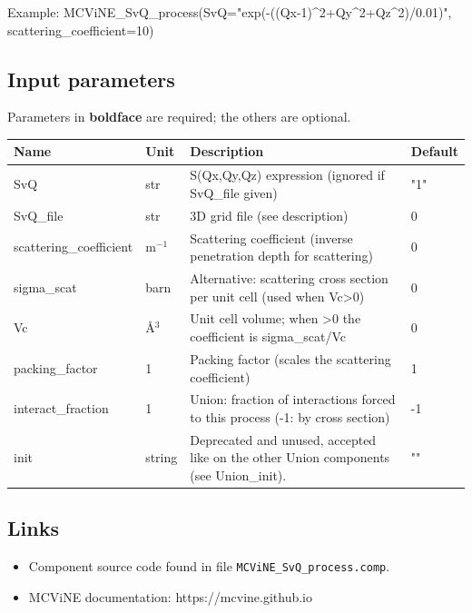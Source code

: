 Example: MCViNE\_SvQ\_process(SvQ="exp(-((Qx-1)\textasciicircum{}2+Qy\textasciicircum{}2+Qz\textasciicircum{}2)/0.01)", scattering\_coefficient=10)

\subsection*{Input parameters}
Parameters in \textbf{boldface} are required; the others are optional.

\begin{longtable}{p{}p{}p{}p{}}
\toprule
\textbf{Name} & \textbf{Unit} & \textbf{Description} & \textbf{Default} \\
\midrule
\endhead
SvQ & str & S(Qx,Qy,Qz) expression (ignored if SvQ\_file given) & "1" \\
SvQ\_file & str & 3D grid file (see description) & 0 \\
scattering\_coefficient & m$^{-1}$ & Scattering coefficient (inverse penetration depth for scattering) & 0 \\
sigma\_scat & barn & Alternative: scattering cross section per unit cell (used when Vc\textgreater{}0) & 0 \\
Vc & \AA{}$^{3}$ & Unit cell volume; when \textgreater{}0 the coefficient is sigma\_scat/Vc & 0 \\
packing\_factor & 1 & Packing factor (scales the scattering coefficient) & 1 \\
interact\_fraction & 1 & Union: fraction of interactions forced to this process (-1: by cross section) & -1 \\
init & string & Deprecated and unused, accepted like on the other Union components (see Union\_init). & "" \\
\bottomrule
\end{longtable}

\subsection*{Links}
\begin{itemize}
  \item Component source code found in file \texttt{MCViNE\_SvQ\_process.comp}.
  \item MCViNE documentation: https://mcvine.github.io
\end{itemize}
